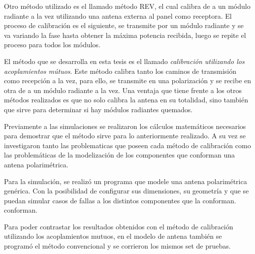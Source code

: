 Otro método utilizado es el llamado método REV, el cual calibra de a un módulo radiante a la vez utilizando una antena externa
al panel como receptora. El proceso de calibración es el siguiente, se transmite por un módulo radiante y se va variando la 
fase hasta obtener la máxima potencia recibida, luego se repite el proceso para todos los módulos. 

El método que se desarrolla en esta tesis es el llamado \emph{calibración utilizando los acoplamientos mútuos}. Este método calibra 
tanto los caminos de transmisión como recepción a la vez, para ello, se transmite en una polarización y se recibe en otra de 
a un módulo radiante a la vez. Una ventaja que tiene frente a los otros métodos realizados es que no solo calibra la antena 
en su totalidad, sino también que sirve para determinar si hay módulos radiantes quemados.

Previamente a las simulaciones se realizaron los cálculos matemáticos necesarios para demostrar que el método sirve para 
lo anteriormente realizado. A su vez se investigaron tanto las problematicas que poseen cada método de calibración como
las problemáticas de la modelización de los componentes que conforman una antena polarimétrica.

Para la simulación, se realizó un programa que modele una antena polarimétrica genérica. Con la posibilidad de configurar 
sus dimensiones, su geometría y que se puedan simular casos de fallas a los distintos componentes que la conforman.
conforman.

Para poder contrastar los resultados obtenidos con el método de calibración utilizando los acoplamientos mutuos, en el modelo 
de antena también se programó el método convencional y se corrieron los mismos set de pruebas.




